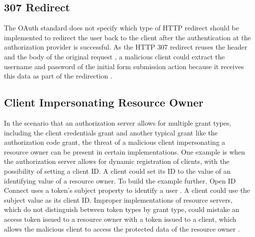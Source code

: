 \documentclass[
    fontsize=12pt,
    headings=small,
    parskip=half,           %
    bibliography=totoc,
    numbers=noenddot,       %
    open=any,               %
    ]{scrreprt}
\begin{document}
\subsection{307 Redirect}
\label{subsec:307}
The OAuth standard does not specify which type of HTTP redirect should be implemented to redirect the user back to the client after the authentication at the authorization provider is successful. As the HTTP 307 redirect reuses the header and the body of the original request \cite{fielding1999rfc2616}, a malicious client could extract the username and password of the initial form submission action because it receives this data as part of the redirection \cite{fett2016comprehensive}.

\subsection{Client Impersonating Resource Owner}
\label{subsec:client_impers_res_own}
In the scenario that an authorization server allows for multiple grant types, including the client credentials grant and another typical grant like the authorization code grant, the threat of a malicious client impersonating a resource owner can be present in certain implementations. One example is when the authorization server allows for dynamic registration of clients, with the possibility of setting a client ID. A client could set its ID to the value of an identifying value of a resource owner. To build the example further, Open ID Connect uses a token's subject property to identify a user \cite{sakimura2014openid}. A client could use the subject value as its client ID. Improper implementations of resource servers, which do not distinguish between token types by grant type, could mistake an access token issued to a resource owner with a token issued to a client, which allows the malicious client to access the protected data of the resource owner \cite{lodderstedt2020oauth}.
\end{document}
